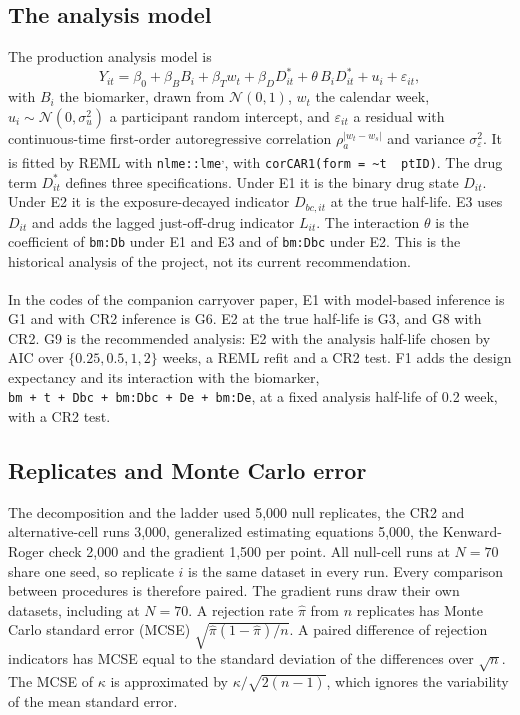 \documentclass[
  11pt,
]{article}
\begin{document}
\subsection{The analysis model}\label{the-analysis-model}

The production analysis model is
\begin{equation}
Y_{it} = \beta_0 + \beta_B B_i + \beta_T w_t + \beta_D D^{\ast}_{it}
  + \theta\,B_i D^{\ast}_{it} + u_i + \varepsilon_{it},
\label{eq:lmm}
\end{equation}
with \(B_i\) the biomarker, drawn from \(\mathcal N(0, 1)\), \(w_t\) the
calendar week, \(u_i \sim \mathcal N(0, \sigma_u^2)\) a participant
random intercept, and \(\varepsilon_{it}\) a residual with
continuous-time first-order autoregressive correlation
\(\rho_a^{|w_t - w_s|}\) and variance \(\sigma_\varepsilon^2\). It is
fitted by REML with \texttt{nlme::lme}\textsuperscript{,}, with
\texttt{corCAR1(form\ =\ \textasciitilde{}t\ \textbar{}\ ptID)}. The drug term \(D^{\ast}_{it}\) defines
three specifications. Under E1 it is the binary drug state \(D_{it}\).
Under E2 it is the exposure-decayed indicator \(D_{bc,it}\) at the true
half-life. E3 uses \(D_{it}\) and adds the lagged just-off-drug
indicator \(L_{it}\). The interaction \(\theta\) is the coefficient of
\texttt{bm:Db} under E1 and E3 and of \texttt{bm:Dbc} under E2. This is the
historical analysis of the project, not its current recommendation.

In the codes of the companion carryover paper\textsuperscript{},
E1 with model-based inference is G1 and with CR2 inference is G6. E2
at the true half-life is G3, and G8 with CR2. G9 is the recommended
analysis: E2 with the analysis half-life chosen by AIC over
\(\{0.25, 0.5, 1, 2\}\) weeks, a REML refit and a CR2 test. F1 adds the
design expectancy and its interaction with the biomarker,
\texttt{bm\ +\ t\ +\ Dbc\ +\ bm:Dbc\ +\ De\ +\ bm:De}, at a fixed analysis half-life
of 0.2 week, with a CR2 test.

\subsection{Replicates and Monte Carlo error}\label{replicates-and-monte-carlo-error}

The decomposition and the ladder used 5,000 null replicates, the CR2
and alternative-cell runs 3,000, generalized estimating equations
5,000, the Kenward-Roger check 2,000 and the gradient 1,500 per point.
All null-cell runs at \(N = 70\) share one seed, so replicate \(i\) is the
same dataset in every run. Every comparison between procedures is
therefore paired. The gradient runs draw their own datasets, including
at \(N = 70\). A rejection rate \(\hat\pi\) from \(n\) replicates has
Monte Carlo standard error (MCSE) \(\sqrt{\hat\pi(1-\hat\pi)/n}\). A
paired difference of rejection indicators has MCSE equal to the
standard deviation of the differences over \(\sqrt n\). The MCSE of
\(\kappa\) is approximated by \(\kappa/\sqrt{2(n-1)}\), which ignores the
variability of the mean standard error.
\end{document}
